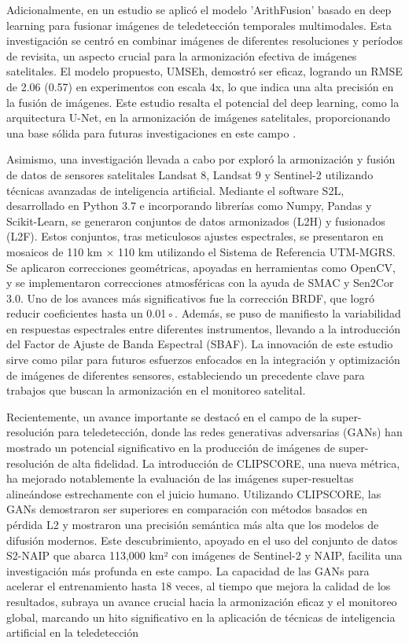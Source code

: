         Adicionalmente, en un estudio se aplicó el modelo ’ArithFusion’ basado en deep learning para fusionar imágenes de teledetección temporales multimodales. Esta investigación se centró en combinar imágenes de diferentes resoluciones y períodos de revisita, un aspecto crucial para la armonización efectiva de imágenes satelitales. El modelo propuesto, UMSEh, demostró ser eficaz, logrando un RMSE de 2.06 (0.57) en experimentos con escala 4x, lo que indica una alta precisión en la fusión de imágenes. Este estudio resalta el potencial del deep learning, como la arquitectura U-Net, en la armonización de imágenes satelitales, proporcionando una base sólida para futuras investigaciones en este campo \autocite{hoque2022arithfusion}. 
        
        Asimismo, una investigación llevada a cabo por \textcite{saunier2022sen2like} exploró la armonización y fusión de datos de sensores satelitales Landsat 8, Landsat 9 y Sentinel-2 utilizando técnicas avanzadas de inteligencia artificial. Mediante el software S2L, desarrollado en Python 3.7 e incorporando librerías como Numpy, Pandas y Scikit-Learn, se generaron conjuntos de datos armonizados (L2H) y fusionados (L2F). Estos conjuntos, tras meticulosos ajustes espectrales, se presentaron en mosaicos de 110 km × 110 km utilizando el Sistema de Referencia UTM-MGRS. Se aplicaron correcciones geométricas, apoyadas en herramientas como OpenCV, y se implementaron correcciones atmosféricas con la ayuda de SMAC y Sen2Cor 3.0. Uno de los avances más significativos fue la corrección BRDF, que logró reducir coeficientes hasta un 0.01◦. Además, se puso de manifiesto la variabilidad en respuestas espectrales entre diferentes instrumentos, llevando a la introducción del Factor de Ajuste de Banda Espectral (SBAF). La innovación de este estudio sirve como pilar para futuros esfuerzos enfocados en la integración y optimización de imágenes de diferentes sensores, estableciendo un precedente clave para trabajos que buscan la armonización en el monitoreo satelital.

        Recientemente, un avance importante se destacó en el campo de la super-resolución para teledetección, donde las redes generativas adversarias (GANs) han mostrado un potencial significativo en la producción de imágenes de super-resolución de alta fidelidad. La introducción de CLIPSCORE, una nueva métrica, ha mejorado notablemente la evaluación de las imágenes super-resueltas alineándose estrechamente con el juicio humano. Utilizando CLIPSCORE, las GANs demostraron ser superiores en comparación con métodos basados en pérdida L2 y mostraron una precisión semántica más alta que los modelos de difusión modernos. Este descubrimiento, apoyado en el uso del conjunto de datos S2-NAIP que abarca 113,000 km² con imágenes de Sentinel-2 y NAIP, facilita una investigación más profunda en este campo. La capacidad de las GANs para acelerar el entrenamiento hasta 18 veces, al tiempo que mejora la calidad de los resultados, subraya un avance crucial hacia la armonización eficaz y el monitoreo global, marcando un hito significativo en la aplicación de técnicas de inteligencia artificial en la teledetección \autocite{wolters2023zooming}

